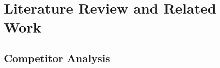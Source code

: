\chapter{Literature Review and Related Work}
\label{chap:relatedworks}



\section{Competitor Analysis}
\label{section:competitor-analysis}




